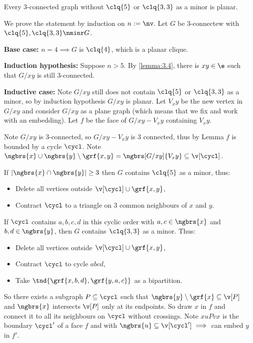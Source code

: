 \begin{customlemma}{4.16}
\label{lemma:4.16}
    Every $3$-connected graph without $\clq{5}$ or $\clq{3, 3}$ as a minor is planar.
\end{customlemma}
\begin{prf}
    We prove the statement by induction on $n := \nv$. Let $G$ be $3$-connectew with $\clq{5}, \clq{3, 3} \nminr G$.

    \textbf{Base case: } $n = 4 \implies G$ is $\clq{4}$, which is a planar clique. 
    
    \textbf{Induction hypothesis: }Suppose $n > 5$. By \ref{lemma:3.4}, there is $xy \in \e$ such that $G / xy$ is still $3$-connected. 
    
    \textbf{Inductive case: }Note $G / xy$ still does not contain $\clq{5}$ or $\clq{3, 3}$ as a minor, so by induction hypothesis $G / xy$ is planar. Let $V_xy$ be the new vertex in $G / xy$ and consider $G /xy$ as a plane graph (which means that we fix and work with an embedding). Let $f$ be the face of $G / xy - V_xy$ containing $V_xy$.

    Note $G / xy$ is $3$-connected, so $G / xy - V_xy$ is 3 connected, thus by Lemma $f$ is bounded by a cycle $\cycl$. Note $\ngbrs{x} \cup \ngbrs{y} \setminus \grf{x, y} = \ngbrs[G / xy]{V_xy} \subseteq \v[\cycl]$.

    If $|\ngbrs{x} \cap \ngbrs{y}| \geq 3$ then $G$ contains $\clq{5}$ as a minor, thus:
    \begin{itemize}
        \item Delete all vertices outside $\v[\cycl] \cup \grf{x, y}$,
        \item Contract $\cycl$ to a triangle on $3$ common neighbours of $x$ and $y$.
    \end{itemize}
    If $\cycl$ contains $a, b, c, d$ in this cyclic order with $a, c \in \ngbrs{x}$ and $b, d \in \ngbrs{y}$, then $G$ contains $\clq{3, 3}$ as a minor. Thus:
    \begin{itemize}
        \item Delete all vertices outside $\v[\cycl] \cup \grf{x, y}$,
        \item Contract $\cycl$ to cycle $abcd$,
        \item Take $\tnd{\grf{x, b, d}, \grf{y, a, c}}$ as a bipartition.
    \end{itemize}

    So there exists a subgraph $P \subseteq \cycl$ such that $\ngbrs{y} \setminus \grf{x} \subseteq \v[P]$ and $\ngbrs{x}$ intersects $\v[P]$ only at its endpoints. So draw $x$ in $f$ and connect it to all its neighbours on $\cycl$ without crossings. Note $xuPvx$ is the boundary $\cycl'$ of a face $f$ and with $\ngbrs{u} \subseteq \v[\cycl'] \implies$ can embed $y$ in $f'$. 
\end{prf}
